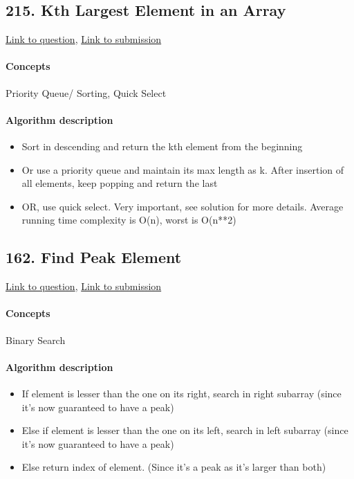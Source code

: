 \documentclass[11pt]{book}
\begin{document}
\subsection{215. Kth Largest Element in an Array}
\href{https://leetcode.com/problems/kth-largest-element-in-an-array/}{Link to question},
\href{https://leetcode.com/submissions/detail/339856317/}{Link to submission}
\paragraph{Concepts}
Priority Queue/ Sorting, Quick Select
\paragraph{Algorithm description}
\begin{itemize}
    \item Sort in descending and return the kth element from the beginning
    \item Or use a priority queue and maintain its max length as k. After insertion of all elements, keep popping and return the last
    \item OR, use quick select. Very important, see solution for more details. Average running time complexity is O(n), worst is O(n**2)
\end{itemize}

\subsection{162. Find Peak Element}
\href{https://leetcode.com/problems/find-peak-element/}{Link to question},
\href{https://leetcode.com/submissions/detail/339879552/}{Link to submission}
\paragraph{Concepts}
Binary Search
\paragraph{Algorithm description}
\begin{itemize}
    \item If element is lesser than the one on its right, search in right subarray (since it's now guaranteed to have a peak)
    \item Else if element is lesser than the one on its left, search in left subarray (since it's now guaranteed to have a peak)
    \item Else return index of element. (Since it's a peak as it's larger than both)
\end{itemize}
\end{document}
